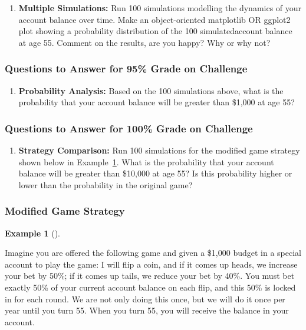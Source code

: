 \documentclass[
  letterpaper,
  DIV=11,
  numbers=noendperiod]{scrartcl}
\providecommand{\tightlist}{%
  \setlength{\itemsep}{0pt}\setlength{\parskip}{0pt}}
\theoremstyle{definition}
\newtheorem{example}{Example}[section]
\theoremstyle{remark}
\begin{document}
\begin{enumerate}
\def\labelenumi{\arabic{enumi}.}
\setcounter{enumi}{3}
\tightlist
\item
  \textbf{Multiple Simulations:} Run 100 simulations modelling the
  dynamics of your account balance over time. Make an object-oriented
  matplotlib OR ggplot2 plot showing a probability distribution of the
  100 simulatedaccount balance at age 55. Comment on the results, are
  you happy? Why or why not?
\end{enumerate}

\subsubsection{Questions to Answer for 95\% Grade on
Challenge}\label{questions-to-answer-for-95-grade-on-challenge}

\begin{enumerate}
\def\labelenumi{\arabic{enumi}.}
\setcounter{enumi}{4}
\tightlist
\item
  \textbf{Probability Analysis:} Based on the 100 simulations above,
  what is the probability that your account balance will be greater than
  \$1,000 at age 55?
\end{enumerate}

\subsubsection{Questions to Answer for 100\% Grade on
Challenge}\label{questions-to-answer-for-100-grade-on-challenge}

\begin{enumerate}
\def\labelenumi{\arabic{enumi}.}
\setcounter{enumi}{5}
\tightlist
\item
  \textbf{Strategy Comparison:} Run 100 simulations for the modified
  game strategy shown below in
  Example~\ref{exm-ErgodicityEconomicsExampleModified}. What is the
  probability that your account balance will be greater than \$10,000 at
  age 55? Is this probability higher or lower than the probability in
  the original game?
\end{enumerate}

\subsubsection{Modified Game Strategy}\label{modified-game-strategy}

\begin{example}[]\protect\hypertarget{exm-ErgodicityEconomicsExampleModified}{}\label{exm-ErgodicityEconomicsExampleModified}

Imagine you are offered the following game and given a \$1,000 budget in
a special account to play the game: I will flip a coin, and if it comes
up heads, we increase your bet by 50\%; if it comes up tails, we reduce
your bet by 40\%. You must bet exactly 50\% of your current account
balance on each flip, and this 50\% is locked in for each round. We are
not only doing this once, but we will do it once per year until you turn
55. When you turn 55, you will receive the balance in your account.

\end{example}
\end{document}
